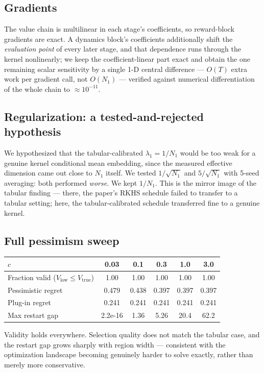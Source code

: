 \subsection{Gradients}
The value chain is multilinear in each stage's coefficients, so reward-block
gradients are exact. A dynamics block's coefficients additionally shift the
\emph{evaluation point} of every later stage, and that dependence runs through
the kernel nonlinearly; we keep the coefficient-linear part exact and obtain the
one remaining scalar sensitivity by a single 1-D central difference --- $O(T)$
extra work per gradient call, not $O(N_1)$ --- verified against numerical
differentiation of the whole chain to $\approx\!10^{-11}$.

\subsection{Regularization: a tested-and-rejected hypothesis}
We hypothesized that the tabular-calibrated $\lambda_1 = 1/N_1$ would be too weak
for a genuine kernel conditional mean embedding, since the measured effective
dimension came out close to $N_1$ itself. We tested $1/\sqrt{N_1}$ and
$5/\sqrt{N_1}$ with 5-seed averaging: both performed \emph{worse}. We kept
$1/N_1$. This is the mirror image of the tabular finding --- there, the paper's
RKHS schedule failed to transfer to a tabular setting; here, the
tabular-calibrated schedule transferred fine to a genuine kernel.

\subsection{Full pessimism sweep}
\begin{center}\small
\begin{tabular}{@{}lccccc@{}}
\toprule
$c$ & 0.03 & 0.1 & 0.3 & 1.0 & 3.0 \\
\midrule
Fraction valid ($V_{\mathrm{low}} \le V_{\mathrm{true}}$) & 1.00 & 1.00 & 1.00 & 1.00 & 1.00 \\
Pessimistic regret & 0.479 & 0.438 & 0.397 & 0.397 & 0.397 \\
Plug-in regret & 0.241 & 0.241 & 0.241 & 0.241 & 0.241 \\
Max restart gap & 2.2e-16 & 1.36 & 5.26 & 20.4 & 62.2 \\
\bottomrule
\end{tabular}
\end{center}

Validity holds everywhere. Selection quality does not match the tabular case, and
the restart gap grows sharply with region width --- consistent with the
optimization landscape becoming genuinely harder to solve exactly, rather than
merely more conservative.

